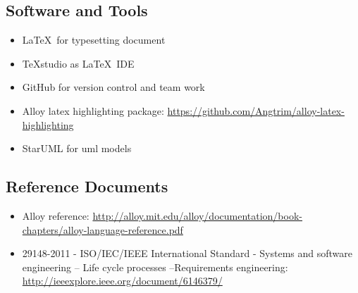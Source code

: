 \subsection{Software and Tools}
	\begin{itemize}
	\item
		\LaTeX\ for typesetting document
	\item
		TeXstudio as \LaTeX\ IDE
	\item
		GitHub for version control and team work
	\item
		Alloy latex highlighting package: \href{https://github.com/Angtrim/alloy-latex-highlighting}{https://github.com/Angtrim/alloy-latex-highlighting}
	\item
		StarUML for uml models
	\end{itemize}
\subsection{Reference Documents}
	\begin{itemize}
		\item Alloy reference:  \href{http://alloy.mit.edu/alloy/documentation/book-chapters/alloy-language-reference.pdf}{http://alloy.mit.edu/alloy/documentation/book-chapters/alloy-language-reference.pdf}
		\item 29148-2011 - ISO/IEC/IEEE International Standard - Systems and software engineering -- Life cycle processes --Requirements engineering: \href{http://ieeexplore.ieee.org/document/6146379/}{http://ieeexplore.ieee.org/document/6146379/}
	\end{itemize}